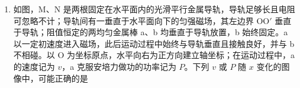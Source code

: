 \documentclass[\gkver]{gaokaozhenti}
\begin{document}
\begin{enumerate}
{A．减弱激光的强度，激光的临界角，折射率均不会改变，故 A 错误；

B．提升瓶内液面的高度，会造成开口处压强增大，水流的速度增大，水流的更远，进而增大了激光束的入射角，则会有大部分光在界面处发生全反射，有助于光速更好的沿液流传播，故 B 正确；

C．若改用折射率更小的液体，临界角变大，更不容易发生全反射，故 C 错误；

D．增大激光器与小孔之间的水平距离不能改变液体的折射率或激光束的入射角，现象不会改变，故 D 错误。

故选 B。
}

\item
如图，M、N 是两根固定在水平面内的光滑平行金属导轨，导轨足够长且电阻可忽略不计；导轨间有一垂直于水平面向下的匀强磁场，其左边界 OO$'$ 垂直于导轨；阻值恒定的两均匀金属棒 a、b 均垂直于导轨放置，b 始终固定。a 以一定初速度进入磁场，此后运动过程中始终与导轨垂直且接触良好，并与 b 不相碰。以 O 为坐标原点，水平向右为正方向建立轴坐标；在运动过程中，a 的速度记为 $v$，a 克服安培力做功的功率记为 $P$。下列 $v$ 或 $P$ 随 $x$ 变化的图像中，可能正确的是
{}
\end{enumerate}
\end{document}
